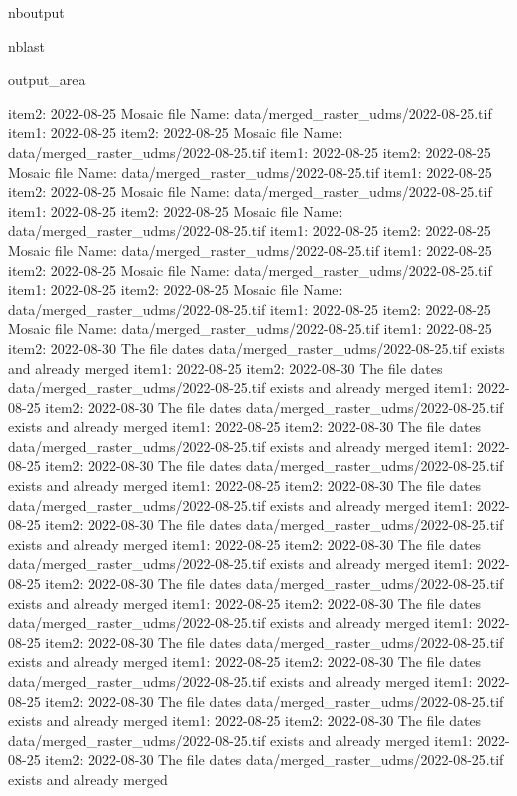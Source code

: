 \documentclass[letterpaper,10pt]{sphinxmanual}
\begin{document}
\begin{sphinxuseclass}{nboutput}
\begin{sphinxuseclass}{nblast}
{\begin{sphinxuseclass}{output_area}
\begin{sphinxuseclass}{}
\begin{sphinxVerbatim}[commandchars=\\\{\}]
item2:  2022-08-25
Mosaic file Name:  data/merged\_raster\_udms/2022-08-25.tif
item1:  2022-08-25
item2:  2022-08-25
Mosaic file Name:  data/merged\_raster\_udms/2022-08-25.tif
item1:  2022-08-25
item2:  2022-08-25
Mosaic file Name:  data/merged\_raster\_udms/2022-08-25.tif
item1:  2022-08-25
item2:  2022-08-25
Mosaic file Name:  data/merged\_raster\_udms/2022-08-25.tif
item1:  2022-08-25
item2:  2022-08-25
Mosaic file Name:  data/merged\_raster\_udms/2022-08-25.tif
item1:  2022-08-25
item2:  2022-08-25
Mosaic file Name:  data/merged\_raster\_udms/2022-08-25.tif
item1:  2022-08-25
item2:  2022-08-25
Mosaic file Name:  data/merged\_raster\_udms/2022-08-25.tif
item1:  2022-08-25
item2:  2022-08-25
Mosaic file Name:  data/merged\_raster\_udms/2022-08-25.tif
item1:  2022-08-25
item2:  2022-08-25
Mosaic file Name:  data/merged\_raster\_udms/2022-08-25.tif
item1:  2022-08-25
item2:  2022-08-30
The file dates data/merged\_raster\_udms/2022-08-25.tif exists and already merged
item1:  2022-08-25
item2:  2022-08-30
The file dates data/merged\_raster\_udms/2022-08-25.tif exists and already merged
item1:  2022-08-25
item2:  2022-08-30
The file dates data/merged\_raster\_udms/2022-08-25.tif exists and already merged
item1:  2022-08-25
item2:  2022-08-30
The file dates data/merged\_raster\_udms/2022-08-25.tif exists and already merged
item1:  2022-08-25
item2:  2022-08-30
The file dates data/merged\_raster\_udms/2022-08-25.tif exists and already merged
item1:  2022-08-25
item2:  2022-08-30
The file dates data/merged\_raster\_udms/2022-08-25.tif exists and already merged
item1:  2022-08-25
item2:  2022-08-30
The file dates data/merged\_raster\_udms/2022-08-25.tif exists and already merged
item1:  2022-08-25
item2:  2022-08-30
The file dates data/merged\_raster\_udms/2022-08-25.tif exists and already merged
item1:  2022-08-25
item2:  2022-08-30
The file dates data/merged\_raster\_udms/2022-08-25.tif exists and already merged
item1:  2022-08-25
item2:  2022-08-30
The file dates data/merged\_raster\_udms/2022-08-25.tif exists and already merged
item1:  2022-08-25
item2:  2022-08-30
The file dates data/merged\_raster\_udms/2022-08-25.tif exists and already merged
item1:  2022-08-25
item2:  2022-08-30
The file dates data/merged\_raster\_udms/2022-08-25.tif exists and already merged
item1:  2022-08-25
item2:  2022-08-30
The file dates data/merged\_raster\_udms/2022-08-25.tif exists and already merged
item1:  2022-08-25
item2:  2022-08-30
The file dates data/merged\_raster\_udms/2022-08-25.tif exists and already merged
item1:  2022-08-25
item2:  2022-08-30
The file dates data/merged\_raster\_udms/2022-08-25.tif exists and already merged

\end{sphinxVerbatim}
\end{sphinxuseclass}
\end{sphinxuseclass}}
\end{sphinxuseclass}
\end{sphinxuseclass}
\end{document}
